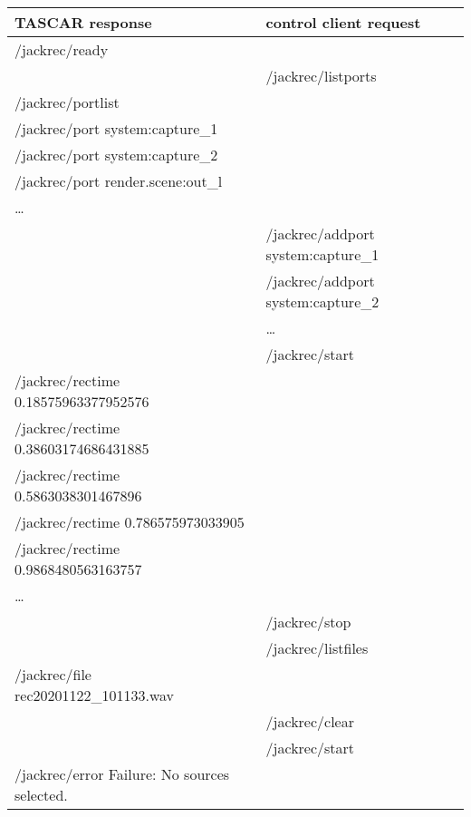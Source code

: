 \begin{tabular}{|l|l|}
  \hline
  TASCAR response                               & control client request             \\
  \hline
  \hline
  /jackrec/ready                                &                                    \\
  \hline
                                                & /jackrec/listports                 \\
  \hline
  /jackrec/portlist                             &                                    \\
  /jackrec/port system:capture\_1               &                                    \\
  /jackrec/port system:capture\_2               &                                    \\
  /jackrec/port render.scene:out\_l             &                                    \\
  \dots                                         &                                    \\
  \hline
                                                & /jackrec/addport system:capture\_1 \\
                                                & /jackrec/addport system:capture\_2 \\
                                                & \dots                              \\
  \hline
                                                & /jackrec/start                     \\
  \hline
  /jackrec/rectime 0.18575963377952576          &                                    \\
  /jackrec/rectime 0.38603174686431885          &                                    \\
  /jackrec/rectime 0.5863038301467896           &                                    \\
  /jackrec/rectime 0.786575973033905            &                                    \\
  /jackrec/rectime 0.9868480563163757           &                                    \\
  \dots                                         &                                    \\
  \hline
                                                & /jackrec/stop                      \\
  \hline
                                                & /jackrec/listfiles                 \\
  \hline
  /jackrec/file rec20201122\_101133.wav         &                                    \\
  \hline
  \hline
                                                & /jackrec/clear                     \\
                                                & /jackrec/start                     \\
  \hline
   /jackrec/error Failure: No sources selected. &                                    \\
  \hline
\end{tabular}

